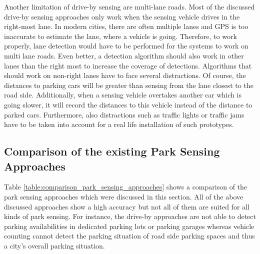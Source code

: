Another limitation of drive-by sensing are multi-lane roads. Most of the discussed drive-by sensing approaches only work when the sensing vehicle drives in the right-most lane. In modern cities, there are often multiple lanes and GPS is too inaccurate to estimate the lane, where a vehicle is going. Therefore, to work properly, lane detection would have to be performed for the systems to work on multi lane roads. Even better, a detection algorithm should also work in other lanes than the right most to increase the coverage of detections. Algorithms that should work on non-right lanes have to face several distractions. Of course, the distances to parking cars will be greater than sensing from the lane closest to the road side. Additionally, when a sensing vehicle overtakes another car which is going slower, it will record the distances to this vehicle instead of the distance to parked cars. Furthermore, also distractions such as traffic lights or traffic jams have to be taken into account for a real life installation of such prototypes.




\subsection{Comparison of the existing Park Sensing Approaches}
\label{sec:comparison_park_sensing_approaches}

Table \ref{table:comparison_park_sensing_approaches} shows a comparison of the park sensing approaches which were discussed in this section. All of the above discussed approaches show a high accuracy but not all of them are suited for all kinds of park sensing. For instance, the drive-by approaches are not able to detect parking availabilities in dedicated parking lots or parking garages whereas vehicle counting cannot detect the parking situation of road side parking spaces and thus a city's overall parking situation.

